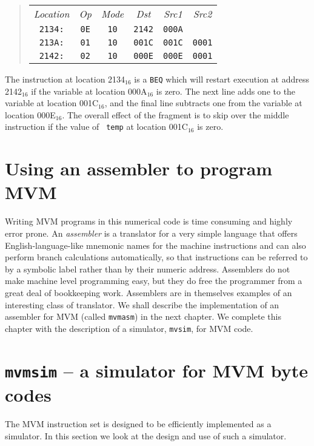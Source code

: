 \begin{quote}
\begin{tabular}{cccccc}
\em Location&\em Op&\em Mode&\em Dst&\em Src1&\em Src2\\
\tt 2134:&\tt 0E&\tt 10&\tt 2142&\tt 000A\\
\tt 213A:&\tt 01&\tt 10&\tt 001C&\tt 001C&\tt 0001\\
\tt 2142:&\tt 02&\tt 10&\tt 000E&\tt 000E&\tt 0001\\
\end{tabular}
\end{quote}

The instruction at location 2134$_{16}$ is a {\tt BEQ} which will restart
execution at address 2142$_{16}$ if the variable at location 000A$_{16}$ is zero. The
next line adds one to the variable at  location 001C$_{16}$, and the final line
subtracts one from the variable at location 000E$_{16}$. The  overall effect of
the fragment is to skip over the middle instruction if the value of {\tt
temp} at location 001C$_{16}$ is zero.

\section{Using an assembler to program MVM}

Writing MVM programs in this numerical code is time consuming and highly
error prone.  An {\em assembler} is a translator for a very simple
language that offers English-language-like mnemonic names for the machine
instructions and can also perform branch calculations automatically, so
that instructions can be referred to by a symbolic label rather than by 
their numeric address. Assemblers do not make machine level programming
easy, but they do free the programmer from a great deal of bookkeeping
work. Assemblers are in themselves  examples of an interesting class of
translator. We shall describe the implementation of an assembler for MVM
(called {\tt mvmasm}) in the next chapter.
We complete this chapter with the description of a simulator,
{\tt mvsim}, for MVM code.

\section{{\tt mvmsim} -- a simulator for MVM byte codes}

The MVM instruction set is designed to be efficiently implemented as a simulator. In this
section we look at the design and use of such a simulator. 

